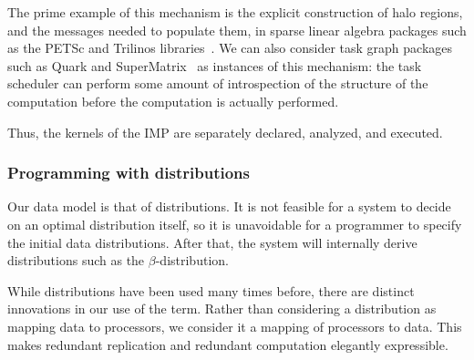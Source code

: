 The prime example of this mechanism is the explicit construction of
halo regions, and the messages needed to populate them, in sparse linear
algebra packages such as the PETSc and Trilinos libraries~\cite{GrSm:petsc,Trilinos}.
We can also consider task graph packages such as
Quark and SuperMatrix~\cite{Yarkhan:quark-report,spaa2007,Quintana:2008:PMA}
as instances of this mechanism: the task scheduler can perform some amount of introspection
of the structure of the computation before the computation is actually performed.

Thus, the kernels of the \ac{IMP} are separately declared, analyzed,
and executed.




\subsubsection{Programming with distributions}

Our data model is that of distributions.
It is not feasible for a
system to decide on an optimal distribution itself, so it is unavoidable
for a programmer to specify the initial data distributions.
After that, the system will internally derive distributions such as
the $\beta$-distribution.

While distributions
have been used many times before, there are distinct innovations in our use
of the term.
Rather than considering a distribution as mapping data to processors,
  we consider it a mapping of processors to data. This makes redundant
  replication and redundant computation elegantly expressible.

\endinput
Thus the key to the success of \ac{IMP}
is that it lets the programmer spell out
\begin{enumerate}
\item Available data parallelism
\item The data access pattern of the algorithm.
\end{enumerate}
This makes the model more powerful than existing systems,
which derive this information through a combination
of the compiler and the runtime system.

As we will see in the examples below, this specification can take a
number of elegant forms that are no great imposition on the
programmer.
